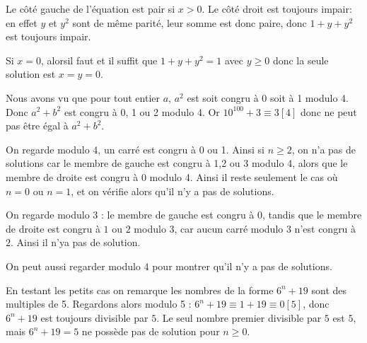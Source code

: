 

\begin{sol}
Le côté gauche de l'équation est pair si $x>0$. Le côté droit est toujours impair: en effet $y$ et $y^2$ sont de même parité, leur somme est donc paire, donc $1+y+y^2$ est toujours impair.

\smallskip

Si $x=0$, alorsil faut et il suffit que $1+y+y^2=1$ avec $y\geq 0$ donc la seule solution est $x=y=0$.
\end{sol}


\begin{sol}
Nous avons vu que pour tout entier $a$, $a^2$ est soit congru à 0 soit à 1 modulo 4. Donc $a^2 + b^2$ est congru à 0, 1 ou 2 modulo 4. Or $10^{100} + 3\equiv 3[4]$ donc ne peut pas être égal à $a^2 + b^2$.
\end{sol}


\begin{sol}
On regarde modulo 4, un carré est congru à 0 ou 1. Ainsi si $n\geq 2$, on n'a pas de solutions car le membre de gauche est congru à 1,2 ou 3 modulo 4, alors que le membre de droite est congru à 0 modulo 4. Ainsi il reste seulement le cas où $n=0$ ou $n=1$, et on vérifie alors qu'il n'y a pas de solutions.
\end{sol}


\begin{sol}
On regarde modulo 3 : le membre de gauche est congru à $0$, tandis que le membre de droite est congru à $1$ ou $2$ modulo $3$, car aucun carré modulo $3$ n'est congru à $2$. Ainsi il n'ya pas de solution.

\smallskip

On peut aussi regarder modulo $4$ pour montrer qu'il n'y a pas de solutions.
\end{sol}


\begin{sol}
En testant les petits cas on remarque les nombres de la forme $6^n+19$ sont des multiples de 5. Regardons alors modulo 5 :
\newline
$6^n+19\equiv 1+19\equiv 0[5]$, donc $6^n+19$ est toujours divisible par $5$. Le seul nombre premier divisible par $5$ est $5$, mais $6^n+19=5$ ne possède pas de solution pour $n\ge 0$.
\end{sol}


